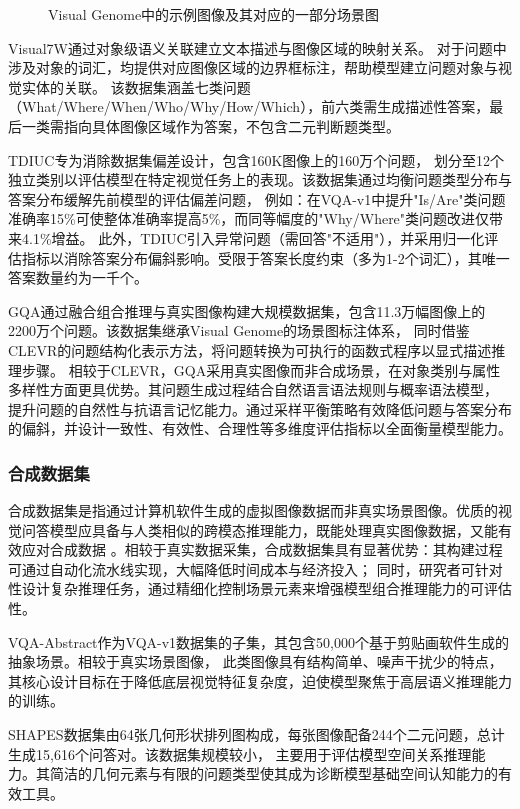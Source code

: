 \begin{figure}[htbp]
\begin{subfigure}[b]{0.45\textwidth}
    \end{subfigure}
    \caption{Visual Genome中的示例图像及其对应的一部分场景图}
\end{figure}

Visual7W\cite{zhu2016visual7w}通过对象级语义关联建立文本描述与图像区域的映射关系。
对于问题中涉及对象的词汇，均提供对应图像区域的边界框标注，帮助模型建立问题对象与视觉实体的关联。
该数据集涵盖七类问题（What/Where/When/Who/Why/How/Which），前六类需生成描述性答案，最后一类需指向具体图像区域作为答案，不包含二元判断题类型。

TDIUC\cite{kafle2017analysis}专为消除数据集偏差设计，包含160K图像上的160万个问题，
划分至12个独立类别以评估模型在特定视觉任务上的表现。该数据集通过均衡问题类型分布与答案分布缓解先前模型的评估偏差问题，
例如：在VQA-v1中提升"Is/Are"类问题准确率15\%可使整体准确率提高5\%，而同等幅度的"Why/Where"类问题改进仅带来4.1\%增益。
此外，TDIUC引入异常问题（需回答"不适用"），并采用归一化评估指标以消除答案分布偏斜影响。受限于答案长度约束（多为1-2个词汇），其唯一答案数量约为一千个。

GQA\cite{hudson2019gqa}通过融合组合推理与真实图像构建大规模数据集，包含11.3万幅图像上的2200万个问题。该数据集继承Visual Genome的场景图标注体系，
同时借鉴CLEVR\cite{johnson2017clevr}的问题结构化表示方法，将问题转换为可执行的函数式程序以显式描述推理步骤。
相较于CLEVR，GQA采用真实图像而非合成场景，在对象类别与属性多样性方面更具优势。其问题生成过程结合自然语言语法规则与概率语法模型，
提升问题的自然性与抗语言记忆能力。通过采样平衡策略有效降低问题与答案分布的偏斜，并设计一致性、有效性、合理性等多维度评估指标以全面衡量模型能力。
\subsubsection{合成数据集}
合成数据集是指通过计算机软件生成的虚拟图像数据而非真实场景图像。优质的视觉问答模型应具备与人类相似的跨模态推理能力，既能处理真实图像数据，又能有效应对合成数据
。相较于真实数据采集，合成数据集具有显著优势：其构建过程可通过自动化流水线实现，大幅降低时间成本与经济投入；
同时，研究者可针对性设计复杂推理任务，通过精细化控制场景元素来增强模型组合推理能力的可评估性。

VQA-Abstract作为VQA-v1数据集的子集，其包含50,000个基于剪贴画软件生成的抽象场景。相较于真实场景图像，
此类图像具有结构简单、噪声干扰少的特点，其核心设计目标在于降低底层视觉特征复杂度，迫使模型聚焦于高层语义推理能力的训练。

SHAPES\cite{andreas2016neural}数据集由64张几何形状排列图构成，每张图像配备244个二元问题，总计生成15,616个问答对。该数据集规模较小，
主要用于评估模型空间关系推理能力。其简洁的几何元素与有限的问题类型使其成为诊断模型基础空间认知能力的有效工具。


